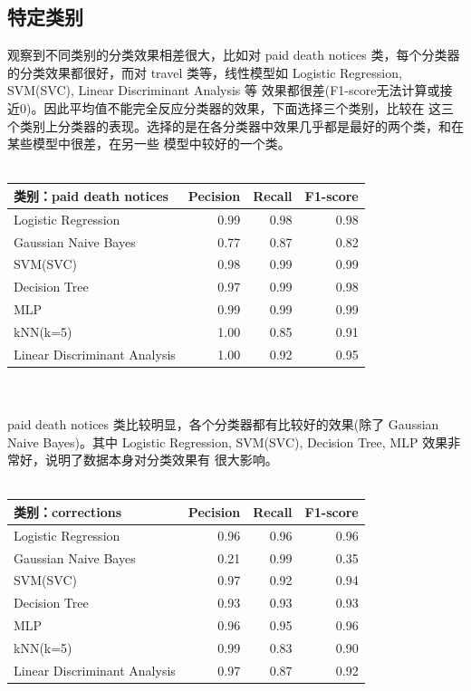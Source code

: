 \documentclass[12pt]{article}
\begin{document}
\subsection{特定类别}
观察到不同类别的分类效果相差很大，比如对 paid death notices 类，每个分类器的分类效果都很好，而对
 travel 类等，线性模型如 Logistic Regression, SVM(SVC), Linear Discriminant Analysis 等
效果都很差(F1-score无法计算或接近0)。因此平均值不能完全反应分类器的效果，下面选择三个类别，比较在
这三个类别上分类器的表现。选择的是在各分类器中效果几乎都是最好的两个类，和在某些模型中很差，在另一些
模型中较好的一个类。\\
\\
\begin{tabular}{l|r|r|r}
  \hline
  类别：\textbf{paid death notices} &Pecision&Recall&F1-score\\
  \hline
  Logistic Regression& 0.99&0.98&0.98\\
  \hline
  Gaussian Naive Bayes&0.77&0.87&0.82\\
  \hline
  SVM(SVC)&0.98&0.99&0.99\\
  \hline
  Decision Tree&0.97&0.99&0.98\\
  \hline
  MLP&0.99&0.99&0.99\\
  \hline
  kNN(k=5)&1.00&0.85&0.91\\
  \hline
  Linear Discriminant Analysis&1.00&0.92&0.95\\
  \hline
\end{tabular}
\\
\\
paid death notices 类比较明显，各个分类器都有比较好的效果(除了 Gaussian Naive Bayes)。其中
Logistic Regression, SVM(SVC), Decision Tree, MLP 效果非常好，说明了数据本身对分类效果有
很大影响。
\\
\\
\begin{tabular}{l|r|r|r}
  \hline
  类别：\textbf{corrections} &Pecision&Recall&F1-score\\
  \hline
  Logistic Regression& 0.96&0.96&0.96\\
  \hline
  Gaussian Naive Bayes&0.21&0.99&0.35\\
  \hline
  SVM(SVC)&0.97&0.92&0.94\\
  \hline
  Decision Tree&0.93&0.93&0.93\\
  \hline
  MLP&0.96&0.95&0.96\\
  \hline
  kNN(k=5)&0.99&0.83&0.90\\
  \hline
  Linear Discriminant Analysis&0.97&0.87&0.92\\
  \hline
\end{tabular}
\end{document}
